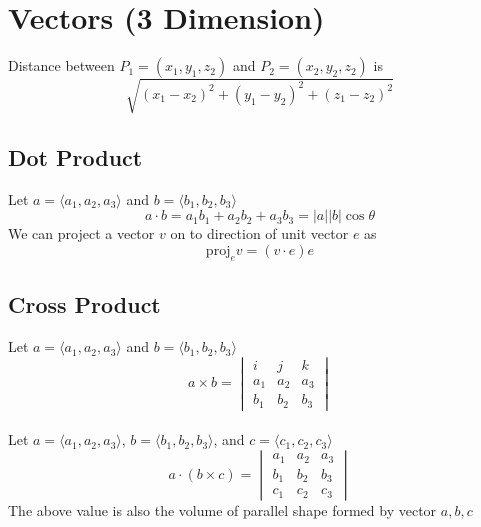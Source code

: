 \documentclass[a4paper,12pt]{article}
\begin{document}
\section{Vectors (3 Dimension)}
Distance between $P_1=(x_1,y_1,z_2)$ and $P_2=(x_2,y_2,z_2)$ is
$$\sqrt{(x_1-x_2)^2+(y_1-y_2)^2+(z_1-z_2)^2}$$

\subsection{Dot Product}
Let $a=\langle a_1,a_2,a_3\rangle$ and $b=\langle b_1,b_2,b_3\rangle$
$$a\cdot b=a_1b_1+a_2b_2+a_3b_3=|a||b|\cos\theta$$
We can project a vector $v$ on to direction of unit vector $e$ as
$$\text{proj}_e v=(v\cdot e)e$$

\subsection{Cross Product}
Let $a=\langle a_1,a_2,a_3\rangle$ and $b=\langle b_1,b_2,b_3\rangle$
$$a\times b=\begin{vmatrix}
 i & j & k \\
 a_1 & a_2 & a_3 \\
 b_1 & b_2 & b_3
\end{vmatrix}$$
\\
Let $a=\langle a_1,a_2,a_3\rangle$, $b=\langle b_1,b_2,b_3\rangle$, and $c=\langle c_1,c_2,c_3\rangle$
$$a\cdot(b\times c)=\begin{vmatrix}
a_1 & a_2 & a_3 \\
b_1 & b_2 & b_3 \\
c_1 & c_2 & c_3
\end{vmatrix}$$
The above value is also the volume of parallel shape formed by vector $a, b, c$
\end{document}
